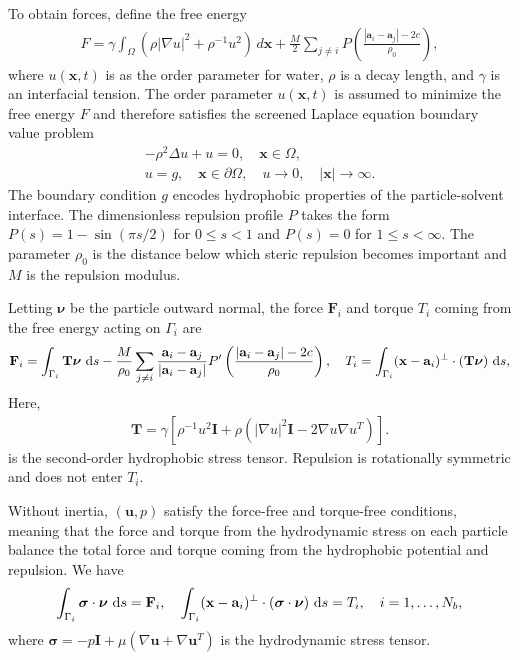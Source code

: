 \documentclass[prb,preprint,showpacs,preprintnumbers,amsmath,amssymb,longbibliography]{revtex4-1}
\renewcommand{\aa}{\mathbf{a}}
\newcommand{\bd}{\partial}
\newcommand{\FF}{\mathbf{F}}
\newcommand{\nnu}{\boldsymbol{\nu}}
\newcommand{\ssigma}{\boldsymbol{\sigma}}
\newcommand{\xx}{\mathbf{x}}
\newcommand{\uu}{\mathbf{u}}
\begin{document}
To obtain forces, define the free
energy~\cite{Fu20, Fu2022_JFM}
\begin{align}
\label{eq:free_energy}
F = \gamma
  \int_{\Omega} \left(\rho |\nabla u|^2 + \rho^{-1} u^2 \right)
\,d\xx
+ \frac{M}{2}
\sum_{j \neq i} 
P\left(\frac{|\aa_i - \aa_j|-2c}{\rho_0}\right),
\end{align}
where $u(\xx,t)$ is as the order parameter for water\cite{Ma77, GoHaKo94},
$\rho$ is a decay length, and $\gamma$ is an interfacial tension. 
The order parameter $u(\xx,t)$ is assumed to minimize the free energy
$F$ and therefore satisfies the screened Laplace equation
boundary value problem
\begin{gather}
  \label{eq:SL}
  -\rho^2 \Delta u + u = 0,\quad \xx \in \Omega, \\
  \label{eq:SLbc}
  u = g, \quad \xx \in \bd\Omega, \quad 
  u \rightarrow 0, \quad |\xx| \rightarrow \infty.
\end{gather}
The boundary condition $g$ encodes hydrophobic properties of the
particle-solvent interface.
The dimensionless repulsion profile $P$ takes the form $P(s) = 1 -
\sin(\pi s/2)$ for $0 \leq s < 1$ and $P(s) = 0$ for $1 \leq s <
\infty$. The parameter $\rho_0$ is the distance 
below which steric repulsion becomes important and 
$M$ is the repulsion modulus.

Letting $\nnu$ be the particle outward normal,
the force $\FF_i$ and torque $T_i$ coming from the free energy
acting on $\Gamma_i$ are~\cite{Fu20}
\begin{align}
  \label{eq:FandTdef}
  \FF_i = \int_{\Gamma_i} \mathbf{T}\nnu \, \dif s
  - \frac{M}{\rho_0}
  \sum_{j \neq i}
  \frac{\aa_i - \aa_j}{|\aa_i - \aa_j|}
P'\left(\frac{|\aa_i - \aa_j|-2c}{\rho_0}\right)
  ,\quad
T_i = \int_{\Gamma_i} (\xx - \aa_i)^{\perp}\cdot (\mathbf{T}\nnu) \, \dif s, 
\end{align}
Here,
\begin{align}
\mathbf{T} = \gamma \left[ \rho^{-1} u^2 \mathbf{I}
  + \rho \left(|\nabla u|^2 \mathbf{I} - 2\nabla u \nabla u^T\right)\right].
\end{align}
is the second-order hydrophobic stress tensor.
Repulsion is rotationally symmetric and
does not enter $T_i$.

Without inertia, $(\uu, p)$ satisfy the force-free and torque-free
conditions, meaning that the force and torque from the hydrodynamic
stress on each particle balance the total force and torque coming from
the hydrophobic potential and repulsion. We have
\begin{equation}
  \label{eq:force}
 \int_{\Gamma_i} \ssigma \cdot \nnu \, \dif s = \FF_i, \quad
 \int_{\Gamma_i} (\xx - \aa_i)^\perp \cdot 
  (\ssigma \cdot \nnu) \, \dif s = T_i,
  \quad i=1,\ldots,N_b,
\end{equation}
where $\ssigma = -p \mathbf{I} + \mu \left(\nabla \uu + \nabla \uu^T
\right)$ is the hydrodynamic stress tensor.
\end{document}

